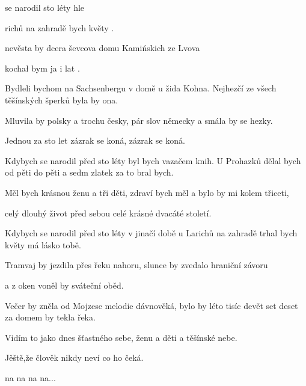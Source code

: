 

\zs
{} se narodil  sto léty
 hle     

richů na zahradě  bych květy
 .    

 nevěsta by  dcera ševcova
 domu Kamińskich  ze Lvova

kochał bym ja i   lat .
\ks

\zs
Bydleli bychom na Sachsenbergu v domě u žida Kohna.
Nejhezčí ze všech těšínských šperků byla by ona.

Mluvila by polsky a trochu česky,
pár slov německy a smála by se hezky.

Jednou za sto let zázrak se koná, zázrak se koná.
\ks

\zs
Kdybych se narodil před sto léty byl bych vazačem knih.
U Prohazků dělal bych od pěti do pěti a sedm zlatek za to bral bych.

Měl bych krásnou ženu a tři děti,
zdraví bych měl a bylo by mi kolem třiceti,

celý dlouhý život před sebou celé krásné dvacáté století.
\ks

\zs
Kdybych se narodil před sto léty v jinačí době
u Larichů na zahradě trhal bych květy má lásko tobě.

Tramvaj by jezdila přes řeku nahoru,
slunce by zvedalo hraniční závoru

a z oken voněl by sváteční oběd.
\ks

\zs
Večer by zněla od Mojzese melodie dávnověká,
bylo by léto tisíc devět set deset za domem by tekla řeka.

Vidím to jako dnes šťastného sebe,
ženu a děti a těšínské nebe.

Jěště,že člověk nikdy neví co ho čeká.

na na na na...
\ks

\kp





